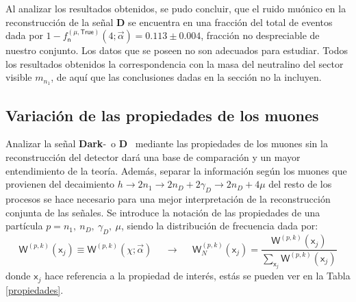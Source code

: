 Al analizar los resultados obtenidos, se pudo concluir, que el ruido muónico en la reconstrucción de la señal \MSSM\textbf{D} se encuentra en una fracción del total de eventos dada por $1 - f^{(\mu, \textsf{True})}_\textsf{n} (4; \vec{\alpha}) =  0.113 \pm 0.004 $, fracción no despreciable de nuestro conjunto. Los datos que se poseen no son adecuados para estudiar. Todos los resultados obtenidos  la correspondencia con la masa del neutralino del sector visible $m_{n_1}$, de aquí que las conclusiones dadas en la sección no la incluyen.

\subsection{Variación de las propiedades de los muones}

Analizar la señal \textbf{Dark}-\SUSY ~o \MSSM\textbf{D}~ mediante las propiedades de los muones sin la reconstrucción del detector dará una base de comparación y un mayor entendimiento de la teoría. Además, separar la información según los muones que provienen del decaimiento $h \rightarrow 2n_1 \rightarrow 2n_D + 2\gamma_D \rightarrow 2n_D + 4\mu$ del resto de los procesos se hace necesario para una mejor interpretación de la reconstrucción conjunta de las señales. Se introduce la notación de las propiedades de una partícula $p= n_1, ~n_D, ~\gamma_D, ~\mu$, siendo la distribución de frecuencia dada por:
\begin{equation}\label{Wpk}
\textsf{W}^{(p,k)} (\textsf{x}_j) \equiv \textsf{W}^{(p,k)} (\chi; \vec{\alpha}) ~~~~~~ \longrightarrow ~~~~~~ \textsf{W}^{(p,k)}_N (\textsf{x}_j) = \dfrac{\textsf{W}^{(p,k)} (\textsf{x}_j)}{ \sum\limits_{\textsf{x}_j} \textsf{W}^{(p,k)} (\textsf{x}_j)}
\end{equation}
donde $\textsf{x}_j$ hace referencia a la propiedad de interés, estás se pueden ver en la Tabla \ref{propiedades}.

